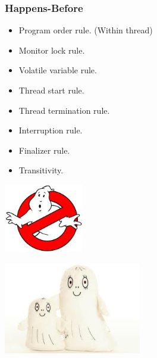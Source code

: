 \documentclass[notheorems]{beamer}%
\theoremstyle{definition}
\begin{document}
\begin{frame}
  \frametitle{Happens-Before}
  \begin{itemize}
  \item Program order rule. (Within thread)
  \item Monitor lock rule.
  \item Volatile variable rule.
  \item Thread start rule.
  \item Thread termination rule.
  \item Interruption rule.
  \item Finalizer rule.
  \item Transitivity.
  \end{itemize}
  \hfill\includegraphics[height=3cm]{ghostbusters.jpg}
\end{frame}

\begin{frame}
  \hfill\includegraphics[height=4cm]{spok2.jpg}\hfill\null
\end{frame}
\end{document}
